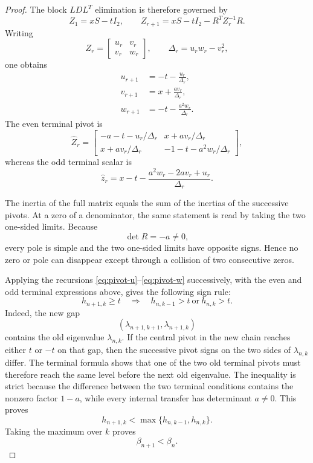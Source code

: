 \documentclass[11pt]{article}
\begin{document}
\begin{proof}
The block \(LDL^T\) elimination is therefore governed by
\[
Z_1=xS-tI_2,
\qquad
Z_{r+1}=xS-tI_2-R^TZ_r^{-1}R.
\]
Writing
\[
Z_r=
\begin{bmatrix}
u_r&v_r\\
v_r&w_r
\end{bmatrix},
\qquad
\Delta_r=u_rw_r-v_r^2,
\]
one obtains
\begin{align}
u_{r+1}
&=
-t-\frac{u_r}{\Delta_r}, \label{eq:pivot-u}\\
v_{r+1}
&=
x+\frac{av_r}{\Delta_r}, \label{eq:pivot-v}\\
w_{r+1}
&=
-t-\frac{a^2w_r}{\Delta_r}. \label{eq:pivot-w}
\end{align}
The even terminal pivot is
\[
\widehat Z_r=
\begin{bmatrix}
-a-t-u_r/\Delta_r&
x+av_r/\Delta_r\\
x+av_r/\Delta_r&
-1-t-a^2w_r/\Delta_r
\end{bmatrix},
\]
whereas the odd terminal scalar is
\[
\widehat z_r
=
x-t-
\frac{a^2w_r-2av_r+u_r}{\Delta_r}.
\]

The inertia of the full matrix equals the sum of the inertias of the successive pivots. At a zero of a denominator, the same statement is read by taking the two one-sided limits. Because
\[
\det R=-a\ne0,
\]
every pole is simple and the two one-sided limits have opposite signs. Hence no zero or pole can disappear except through a collision of two consecutive zeros.

Applying the recursions \eqref{eq:pivot-u}--\eqref{eq:pivot-w} successively, with the even and odd terminal expressions above, gives the following sign rule:
\[
h_{n+1,k}\ge t
\quad\Longrightarrow\quad
h_{n,k-1}>t
\ \text{or}\
h_{n,k}>t.
\]
Indeed, the new gap
\[
(\lambda_{n+1,k+1},\lambda_{n+1,k})
\]
contains the old eigenvalue \(\lambda_{n,k}\). If the central pivot in the new chain reaches either \(t\) or \(-t\) on that gap, then the successive pivot signs on the two sides of \(\lambda_{n,k}\) differ. The terminal formula shows that one of the two old terminal pivots must therefore reach the same level before the next old eigenvalue. The inequality is strict because the difference between the two terminal conditions contains the nonzero factor \(1-a\), while every internal transfer has determinant \(a\ne0\). This proves
\[
h_{n+1,k}
<
\max\{h_{n,k-1},h_{n,k}\}.
\]
Taking the maximum over \(k\) proves
\[
\beta_{n+1}<\beta_n.
\]


\end{proof}
\end{document}
